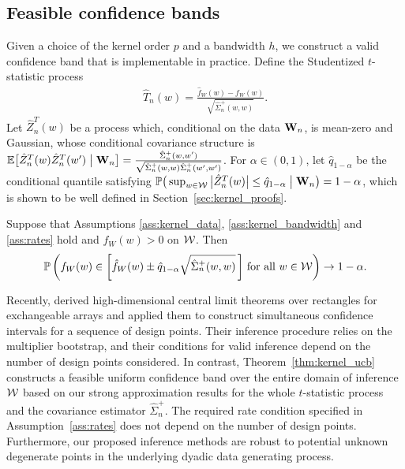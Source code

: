 \subsection{Feasible confidence bands}
\label{sec:feasible_confidence_bands}

Given a choice of the kernel order $p$ and a bandwidth $h$, we construct a
valid confidence band that is implementable in practice. Define the Studentized
$t$-statistic process
%
\begin{align*}
  \hat T_n(w) = \frac{\hat{f}_W(w) - f_W(w)}{\sqrt{\hat \Sigma_n^+(w,w)}}.
\end{align*}
%
Let $\hat Z_n^T(w)$ be a process which, conditional on the data $\mathbf{W}_n$,
is mean-zero and Gaussian, whose conditional covariance structure is
$\mathbb{E}\big[ \hat Z_n^T(w) \hat Z_n^T(w') \bigm\vert \mathbf{W}_n \big]
= \frac{\hat \Sigma_n^+(w,w')}
{\sqrt{\hat \Sigma_n^+(w,w) \hat \Sigma_n^+(w',w')}}$.
For $\alpha \in (0,1)$, let $\hat q_{1-\alpha}$ be the
conditional quantile satisfying
$\mathbb{P}\big(\sup_{w \in \mathcal{W}} \big| \hat Z_n^T(w) \big| \leq \hat q_{1-\alpha}
\bigm\vert \mathbf{W}_n \big) = 1 - \alpha$,
which is shown to be well defined in Section~\ref{sec:kernel_proofs}.

\begin{theorem}
  \label{thm:kernel_ucb}

  Suppose that Assumptions \ref{ass:kernel_data}, \ref{ass:kernel_bandwidth}
  and \ref{ass:rates} hold and $f_W(w) > 0$ on $\mathcal{W}$. Then
  \begin{align*}
    \mathbb{P}\left(
      f_W(w) \in
      \left[ \hat f_W(w) \pm \hat q_{1-\alpha}
      \sqrt{\hat\Sigma_n^+(w,w)} \,\right]
      \,\textup{for all } w \in \mathcal{W}
    \right) \to 1 - \alpha.
  \end{align*}
\end{theorem}

Recently, \citet{chiang2022inference} derived high-dimensional central limit
theorems over rectangles for exchangeable arrays and applied them to construct
simultaneous confidence intervals for a sequence of design points. Their
inference procedure relies on the multiplier bootstrap, and their conditions
for valid inference depend on the number of design points considered. In
contrast, Theorem~\ref{thm:kernel_ucb} constructs a feasible uniform confidence
band over the entire domain of inference $\mathcal{W}$ based on our strong
approximation results for the whole $t$-statistic process and the covariance
estimator $\hat\Sigma_n^+$. The required rate condition specified in
Assumption~\ref{ass:rates} does not depend on the number of design points.
Furthermore, our proposed inference methods are robust to potential unknown
degenerate points in the underlying dyadic data generating process.

